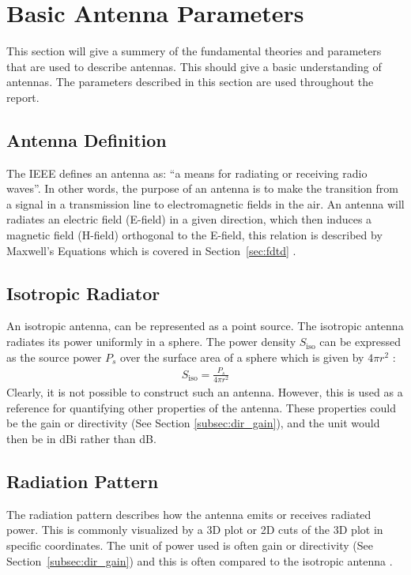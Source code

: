 \section{Basic Antenna Parameters}
\label{sec:basicantennaparams}
This section will give a summery of the fundamental theories and parameters that are used to describe antennas. This should give a basic understanding of antennas. The parameters described in this section are used throughout the report. 

\subsection{Antenna Definition}
\label{subsec:antenna-def}
The IEEE defines an antenna as: ``a means for radiating or receiving radio waves''. In other words, the purpose of an antenna is to make the transition from a signal in a transmission line to electromagnetic fields in the air. An antenna will radiates an electric field (E-field) in a given direction, which then induces a magnetic field (H-field) orthogonal to the E-field, this relation is described by Maxwell's Equations which is covered in Section~\ref{sec:fdtd} \cite{balanis2012antenna}.

\subsection{Isotropic Radiator}
\label{subsec:isotropic-ant}
An isotropic antenna, can be represented as a point source. The isotropic antenna radiates its power uniformly in a sphere. The power density $S_{\text{iso}}$ can be expressed as the source power $P_s$ over the surface area of a sphere which is given by $4\pi r^2$ \cite{balanis2012antenna}:
\begin{align}
    S_{\text{iso}} = \frac{P_s}{4\pi r^2}
\end{align}
Clearly, it is not possible to construct such an antenna. However, this is used as a reference for quantifying other properties of the antenna. These properties could be the gain or directivity (See Section \ref{subsec:dir_gain}), and the unit would then be in \si{dBi} rather than \si{dB}.

\subsection{Radiation Pattern}
\label{subsec:radiation-p}
The radiation pattern describes how the antenna emits or receives radiated power. This is commonly visualized by a 3D plot or 2D cuts of the 3D plot in specific coordinates. The unit of power used is often gain or directivity (See Section~\ref{subsec:dir_gain}) and this is often compared to the isotropic antenna \cite{balanis2012antenna}.

